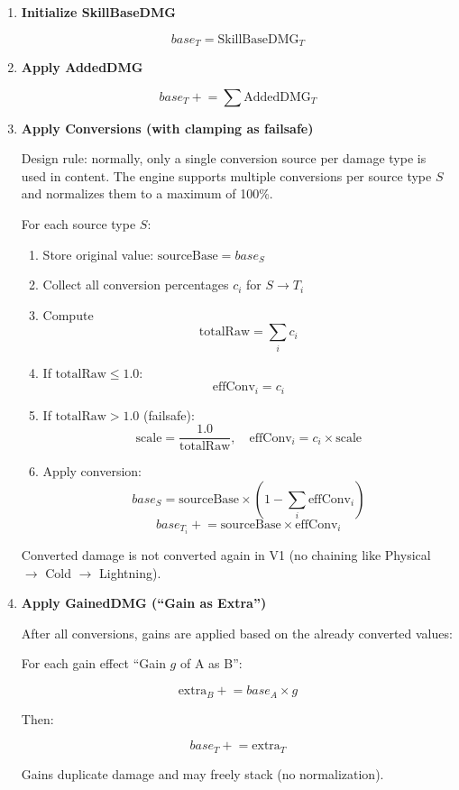 \begin{enumerate}
	\item \textbf{Initialize SkillBaseDMG}
	
	\[
	base_T = \text{SkillBaseDMG}_T
	\]
	
	\item \textbf{Apply AddedDMG}
	
	\[
	base_T \mathrel{+}= \sum \text{AddedDMG}_T
	\]
	
	\item \textbf{Apply Conversions (with clamping as failsafe)}
	
	Design rule: normally, only a single conversion source per damage type is used in content.
	The engine supports multiple conversions per source type $S$ and normalizes them to a maximum of 100\%.
	
	For each source type $S$:
	
	\begin{enumerate}
		\item Store original value: \quad $\text{sourceBase} = base_S$
		\item Collect all conversion percentages $c_i$ for $S \rightarrow T_i$
		\item Compute
		\[
		\text{totalRaw} = \sum_i c_i
		\]
		\item If $\text{totalRaw} \leq 1.0$:
		\[
		\text{effConv}_i = c_i
		\]
		\item If $\text{totalRaw} > 1.0$ (failsafe):
		\[
		\text{scale} = \frac{1.0}{\text{totalRaw}}, \quad
		\text{effConv}_i = c_i \times \text{scale}
		\]
		\item Apply conversion:
		\[
		base_S = \text{sourceBase} \times (1 - \sum_i \text{effConv}_i)
		\]
		\[
		base_{T_i} \mathrel{+}= \text{sourceBase} \times \text{effConv}_i
		\]
	\end{enumerate}
	
	Converted damage is not converted again in V1 (no chaining like Physical $\rightarrow$ Cold $\rightarrow$ Lightning).
	
	\item \textbf{Apply GainedDMG (``Gain as Extra'')}
	
	After all conversions, gains are applied based on the already converted values:
	
	For each gain effect ``Gain $g$ of A as B'':
	
	\[
	\text{extra}_B \mathrel{+}= base_A \times g
	\]
	
	Then:
	
	\[
	base_T \mathrel{+}= \text{extra}_T
	\]
	
	Gains duplicate damage and may freely stack (no normalization).
\end{enumerate}

